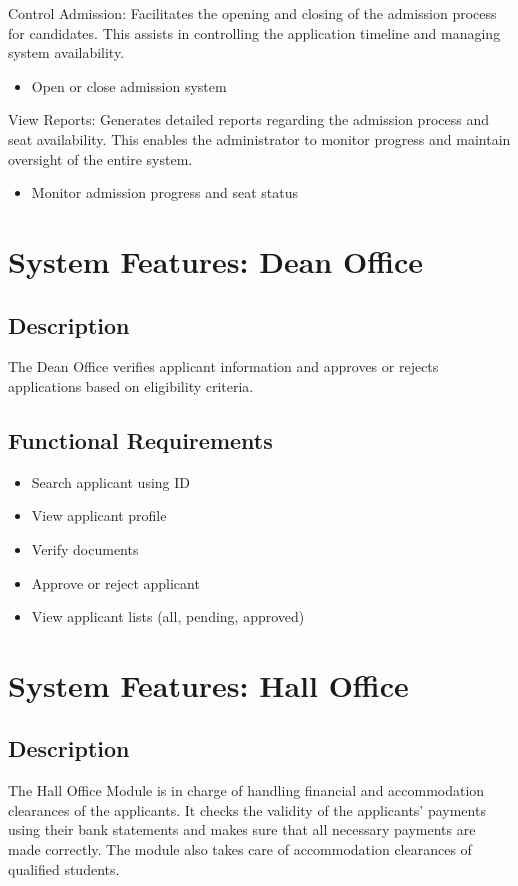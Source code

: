 \vspace{0.2cm}
\noindent Control Admission:
Facilitates the opening and closing of the admission process for candidates. This assists in controlling the application timeline and managing system availability.
\begin{itemize}
    \item Open or close admission system
\end{itemize}

\vspace{0.2cm}
\noindent View Reports:
Generates detailed reports regarding the admission process and seat availability. This enables the administrator to monitor progress and maintain oversight of the entire system.
\begin{itemize}
    \item Monitor admission progress and seat status
\end{itemize}

\section{System Features: Dean Office}

\subsection{Description}
The Dean Office verifies applicant information and approves or rejects applications based on eligibility criteria.

\subsection{Functional Requirements}

\begin{itemize}
    \item Search applicant using ID
    \item View applicant profile
    \item Verify documents
    \item Approve or reject applicant
    \item View applicant lists (all, pending, approved)
\end{itemize}

\section{System Features: Hall Office}

\subsection{Description}
The Hall Office Module is in charge of handling financial and accommodation clearances of the applicants. It checks the validity of the applicants' payments using their bank statements and makes sure that all necessary payments are made correctly. The module also takes care of accommodation clearances of qualified students.

